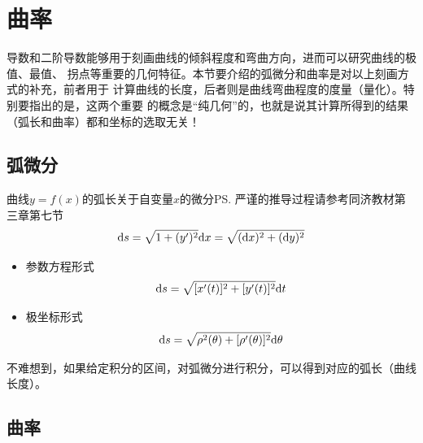\section{曲率}

% 

导数和二阶导数能够用于刻画曲线的倾斜程度和弯曲方向，进而可以研究曲线的极值、最值、
拐点等重要的几何特征。本节要介绍的弧微分和曲率是对以上刻画方式的补充，前者用于
计算曲线的长度，后者则是曲线弯曲程度的度量（量化）。特别要指出的是，这两个重要
的概念是“纯几何”的，也就是说其计算所得到的结果（弧长和曲率）都和坐标的选取无关！

\subsection{弧微分}

曲线$y=f(x)$的弧长关于自变量$x$的微分\ps{严谨的推导过程请参考同济教材第三章第七节}
$$\mathrm{d} s=\sqrt{1+(y')^2}\mathrm{d} x =\sqrt{(\mathrm{d} x)^2+(\mathrm{d} y)^2}$$ 
\begin{itemize}
  \setlength{\itemindent}{1cm}
  \item 参数方程形式 
  $$\mathrm{d} s=\sqrt{[x'(t)]^2+[y'(t)]^2}\mathrm{d} t$$ 
  \vspace{-3ex}
  \item 极坐标形式 
  $$\mathrm{d} s=\sqrt{\rho^2(\theta)+[\rho'(\theta)]^2}\mathrm{d}\theta$$
\end{itemize}
不难想到，如果给定积分的区间，对弧微分进行积分，可以得到对应的弧长（曲线长度）。


\subsection{曲率}

